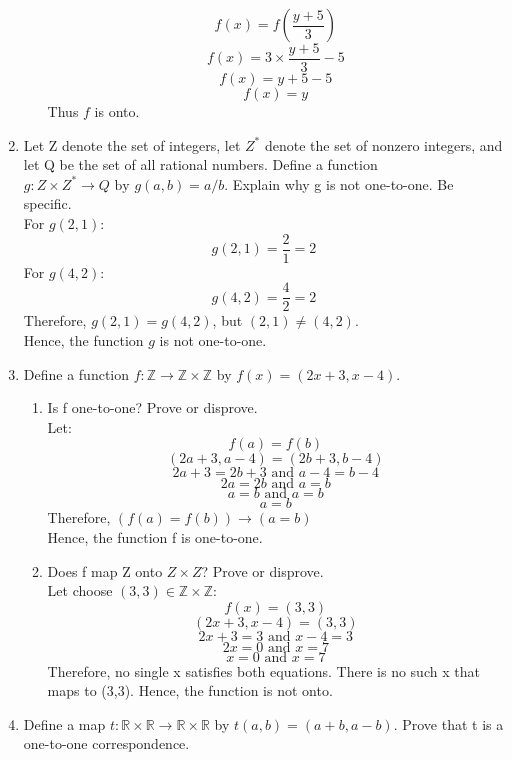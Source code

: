 \documentclass[12pt]{article}
\begin{document}
\begin{enumerate}
\begin{enumerate}
                  \[f(x) = f(\frac{y+5}{3})\]
                  \[f(x) = 3\times \frac{y+5}{3} - 5\]
                  \[f(x) = y + 5 - 5\]
                  \[f(x) = y\]
            Thus $f$ is onto.
            \newpage
      \end{enumerate}
      \item Let Z denote the set of integers, let $Z^*$ denote the set of nonzero integers, and let Q be the set of all rational numbers. Define a function $g : Z \times Z^* \rightarrow Q \text{ by } g(a, b) = a/b$. Explain why g is not one-to-one. Be specific.\\
      For $g(2,1)$:
            \[g(2,1) = \frac{2}{1} = 2\]
      For $g(4,2)$:
            \[g(4,2) = \frac{4}{2} = 2\]
      Therefore, $g(2,1) = g(4,2)$, but $(2,1) \neq (4,2)$.\\ Hence, the function $g$ is not one-to-one.
      \setcounter{enumi}{16}
      \item Define a function $f: \mathds{Z} \rightarrow \mathds{Z} \times \mathds{Z}$ by $f(x) = (2x+3,x-4)$.
      \begin{enumerate}
            \item Is f one-to-one? Prove or disprove.\\
                  Let:
                        \[f(a) = f(b)\]
                        \[(2a+3,a-4) = (2b+3,b-4)\]
                        \[2a+3 = 2b+3 \text{ and } a-4 = b-4\]
                        \[2a = 2b \text{ and } a = b\]
                        \[a = b \text{ and } a = b\]
                        \[a = b\]
                  Therefore, $(f(a) = f(b)) \rightarrow (a = b)$\\
                  Hence, the function f is one-to-one.
            \item Does f map Z onto $Z \times Z$? Prove or disprove.\\
                  Let choose $(3,3) \in \mathds{Z} \times \mathds{Z}$:
                     \[f(x) = (3,3)\]   
                     \[(2x+3, x-4) = (3,3)\]   
                     \[2x+3 = 3 \text{ and } x-4 = 3\]   
                     \[2x=0 \text{ and } x = 7\]   
                     \[x=0 \text{ and } x = 7\]   
                  Therefore, no single x satisfies both equations. There is no such x that maps to (3,3).
                  Hence, the function is not onto.
      \end{enumerate}
      \item Define a map $t: \mathds{R} \times \mathds{R} \rightarrow \mathds{R} \times \mathds{R}$ by $t(a,b) = (a+b,a-b)$. Prove that t is a one-to-one correspondence.\\

\end{enumerate}
\end{document}
